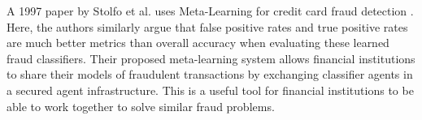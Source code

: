 \documentclass[midd]{thesis}
\begin{document}
%

A 1997 paper by Stolfo et al. uses Meta-Learning for credit card fraud detection \cite{Stolfo1997}. Here, the authors similarly argue that false positive rates and true positive rates are much better metrics than overall accuracy when evaluating these learned fraud classifiers. Their proposed meta-learning system allows financial institutions to share their models of fraudulent transactions by exchanging classifier agents in a secured agent infrastructure. This is a useful tool for financial institutions to be able to work together to solve similar fraud problems. 
\end{document}
